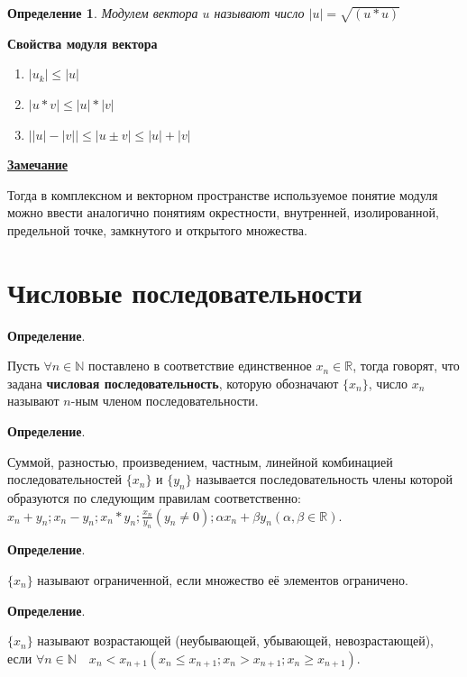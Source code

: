 \documentclass[a4paper,oneside]{article}
\newcommand{\parspace}{\vspace{10pt}}
\newtheorem{definition}{Определение}[subsection]
\begin{document}
\begin{definition}
    Модулем вектора $u$ называют число $|u| = \sqrt{(u * u)}$
\end{definition}

\textbf{Свойства модуля вектора}
\begin{enumerate}
    \item $|u_k| \le |u|$
    \item $|u * v| \le |u| * |v|$
    \item $\big||u| - |v|\big| \le |u \pm v| \le |u| + |v|$
\end{enumerate}

\parspace

\underline{\textbf{Замечание}}

Тогда в комплексном и векторном пространстве используемое понятие модуля
можно ввести аналогично понятиям окрестности, внутренней, изолированной,
предельной точке, замкнутого и открытого множества.

\section{Числовые последовательности}

\textbf{Определение}.

Пусть $\forall n \in \mathbb{N}$ поставлено в соответствие единственное $x_n \in \mathbb{R}$,
тогда говорят, что задана \textbf{числовая последовательность}, которую обозначают
$\{x_n\}$, число $x_n$ называют $n$-ным членом последовательности.

\parspace

\textbf{Определение}.

Суммой, разностью, произведением, частным, линейной комбинацией последовательностей 
$\{x_n\}$ и $\{y_n\}$ называется последовательность члены которой образуются 
по следующим правилам соответственно: 
$x_n + y_n; x_n - y_n; x_n * y_n; \frac{x_n}{y_n} (y_n \ne 0); \alpha x_n + \beta y_n (\alpha, \beta \in \mathbb{R})$.

\parspace

\textbf{Определение}.

$\{x_n\}$ называют ограниченной, если множество её элементов ограничено.

\parspace

\textbf{Определение}.

$\{x_n\}$ называют возрастающей (неубывающей, убывающей, невозрастающей), если
$\forall n \in \mathbb{N} \quad x_n < x_{n + 1} (x_n \le x_{n + 1}; x_n > x_{n + 1}; x_n \ge x_{n + 1})$.
\end{document}

